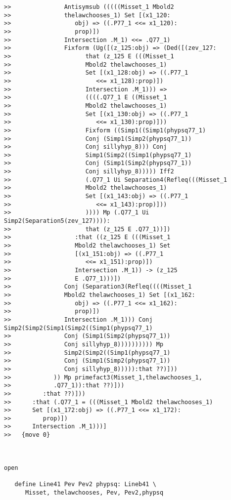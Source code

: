 \documentclass[12pt]{article}
\begin{document}
\begin{verbatim}
>>               Antisymsub (((((Misset_1 Mbold2
>>               thelawchooses_1) Set [(x1_120:
>>                  obj) => ((.P77_1 <<= x1_120):
>>                  prop)])
>>               Intersection .M_1) <<= .Q77_1)
>>               Fixform (Ug([(z_125:obj) => (Ded([(zev_127:
>>                     that (z_125 E (((Misset_1
>>                     Mbold2 thelawchooses_1)
>>                     Set [(x1_128:obj) => ((.P77_1
>>                        <<= x1_128):prop)])
>>                     Intersection .M_1))) =>
>>                     ((((.Q77_1 E ((Misset_1
>>                     Mbold2 thelawchooses_1)
>>                     Set [(x1_130:obj) => ((.P77_1
>>                        <<= x1_130):prop)]))
>>                     Fixform ((Simp1((Simp1(phypsq77_1)
>>                     Conj (Simp1(Simp2(phypsq77_1))
>>                     Conj sillyhyp_8))) Conj
>>                     Simp1(Simp2((Simp1(phypsq77_1)
>>                     Conj (Simp1(Simp2(phypsq77_1))
>>                     Conj sillyhyp_8))))) Iff2
>>                     (.Q77_1 Ui Separation4(Refleq(((Misset_1
>>                     Mbold2 thelawchooses_1)
>>                     Set [(x1_143:obj) => ((.P77_1
>>                        <<= x1_143):prop)]))
>>                     )))) Mp (.Q77_1 Ui Simp2(Separation5(zev_127)))):
>>                     that (z_125 E .Q77_1))])
>>                  :that ((z_125 E (((Misset_1
>>                  Mbold2 thelawchooses_1) Set
>>                  [(x1_151:obj) => ((.P77_1
>>                     <<= x1_151):prop)])
>>                  Intersection .M_1)) -> (z_125
>>                  E .Q77_1)))])
>>               Conj (Separation3(Refleq((((Misset_1
>>               Mbold2 thelawchooses_1) Set [(x1_162:
>>                  obj) => ((.P77_1 <<= x1_162):
>>                  prop)])
>>               Intersection .M_1))) Conj Simp2(Simp2(Simp1(Simp2((Simp1(phypsq77_1)
>>               Conj (Simp1(Simp2(phypsq77_1))
>>               Conj sillyhyp_8)))))))))) Mp
>>               Simp2(Simp2((Simp1(phypsq77_1)
>>               Conj (Simp1(Simp2(phypsq77_1))
>>               Conj sillyhyp_8))))):that ??)]))
>>            )) Mp primefact3(Misset_1,thelawchooses_1,
>>            .Q77_1)):that ??)]))
>>         :that ??)]))
>>      :that (.Q77_1 = (((Misset_1 Mbold2 thelawchooses_1)
>>      Set [(x1_172:obj) => ((.P77_1 <<= x1_172):
>>         prop)])
>>      Intersection .M_1)))]
>>   {move 0}



open

   define Line41 Pev Pev2 phypsq: Lineb41 \
      Misset, thelawchooses, Pev, Pev2,phypsq



\end{verbatim}
\end{document}
